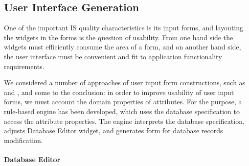 \documentclass[conference]{IEEEtran}
\begin{document}
\subsection{User Interface Generation}
\label{sec:user-interace-form}
One of the important IS quality characteristics is its input forms, and layouting the widgets in the forms is the question of usability.  From one hand side the widgets must efficiently consume the area of a form, and on another hand side, the user interface must be convenient and fit to  application functionality requirements.



We considered a number of approaches of user input form constructions, such as \cite{qt} and \cite{gtk}, and come to the conclusion: in order to improve usability of user input forms, we must account the domain properties of attributes.  For the purpose, a rule-based engine has been developed, which uses the database specification to access the attribute properties.  The engine interprets the database specification, adjusts Database Editor widget, and generates form for database records modification.

\paragraph{Database Editor}
\end{document}
